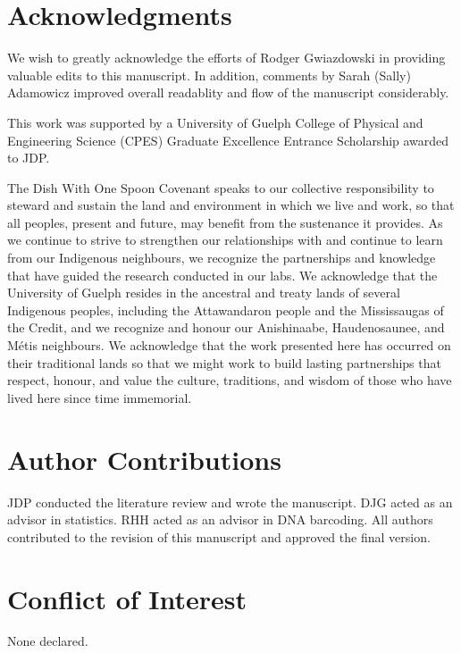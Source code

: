 
\newpage

\section*{Acknowledgments}

We wish to greatly acknowledge the efforts of Rodger Gwiazdowski in providing \\ valuable edits to this manuscript. In addition, comments by Sarah (Sally) Adamowicz improved overall readablity and flow of the manuscript considerably. 

This work was supported by a University of Guelph College of Physical and \\ Engineering Science (CPES) Graduate Excellence Entrance Scholarship awarded to JDP.

The Dish With One Spoon Covenant speaks to our collective responsibility to steward and sustain the land and environment in which we live and work, so that all peoples, present and future, may benefit from the sustenance it provides. As we continue to strive to strengthen our relationships with and continue to learn from our Indigenous neighbours, we recognize the partnerships and knowledge that have guided the research conducted in our labs. We acknowledge that the University of Guelph resides in the ancestral and treaty lands of several Indigenous peoples, including the Attawandaron people and the Mississaugas of the Credit, and we recognize and honour our Anishinaabe, Haudenosaunee, and M{\'e}tis neighbours. We acknowledge that the work presented here has occurred on their traditional lands so that we might work to build lasting partnerships that respect, honour, and value the culture, traditions, and wisdom of those who have lived here since time immemorial.

\section*{Author Contributions}

JDP conducted the literature review and wrote the manuscript. DJG acted as an advisor in statistics. RHH acted as an advisor in DNA barcoding. All authors contributed to the revision of this manuscript and approved the final version. 

\section*{Conflict of Interest}

None declared.

